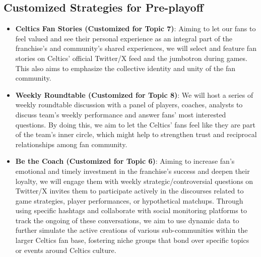 \documentclass[
]{book}
\begin{document}
\hypertarget{customized-strategies-for-pre-playoff}{%
\subsection{Customized Strategies for Pre-playoff}\label{customized-strategies-for-pre-playoff}}

\begin{itemize}
\item
  \textbf{Celtics Fan Stories (Customized for Topic 7)}: Aiming to let our fans to feel valued and see their personal experience as an integral part of the franchise's and community's shared experiences, we will select and feature fan stories on Celtics' official Twitter/X feed and the jumbotron during games. This also aims to emphasize the collective identity and unity of the fan community.
\item
  \textbf{Weekly Roundtable (Customized for Topic 8)}: We will host a series of weekly roundtable discussion with a panel of players, coaches, analysts to discuss team's weekly performance and answer fans' most interested questions. By doing this, we aim to let the Celtics' fans feel like they are part of the team's inner circle, which might help to strengthen trust and reciprocal relationships among fan community.
\item
  \textbf{Be the Coach (Customized for Topic 6)}: Aiming to increase fan's emotional and timely investment in the franchise's success and deepen their loyalty, we will engage them with weekly strategic/controversial questions on Twitter/X invites them to participate actively in the discourses related to game strategies, player performances, or hypothetical matchups. Through using specific hashtags and collaborate with social monitoring platforms to track the ongoing of these conversations, we aim to use dynamic data to further simulate the active creations of various sub-communities within the larger Celtics fan base, fostering niche groups that bond over specific topics or events around Celtics culture.
\end{itemize}

  
\end{document}
